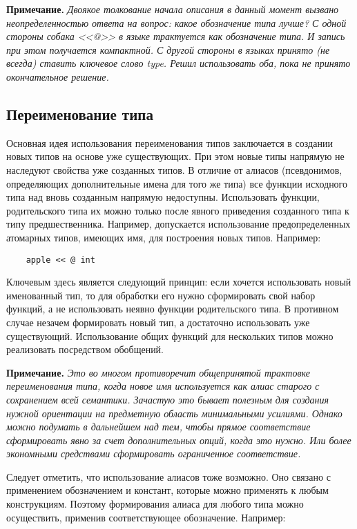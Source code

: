 {\textbf{Примечание.}
\textit{Двоякое толкование начала описания в данный момент вызвано неопределенностью ответа на вопрос: какое обозначение типа лучше? С одной стороны собака <<@>> в языке трактуется как обозначение типа. И запись при этом получается компактной. С другой стороны в языках принято (не всегда) ставить ключевое слово type. Решил использовать оба, пока не принято окончательное решение.}

\subsection{Переименование типа}

Основная идея использования переименования типов заключается в создании новых типов на основе уже существующих. При этом новые типы напрямую не наследуют свойства уже созданных типов. В отличие от алиасов (псевдонимов, определяющих дополнительные имена для того же типа) все функции исходного типа над вновь созданным напрямую недоступны. Использовать функции, родительского типа их можно только после явного приведения созданного типа к типу предшественника. Например, допускается использование предопределенных атомарных типов, имеющих имя, для построения новых типов. Например:

\begin{verbatim}
    apple << @ int
\end{verbatim}


Ключевым здесь является следующий принцип: если хочется использовать новый именованный тип, то для обработки его нужно сформировать свой набор функций, а не использовать неявно функции родительского типа. В противном случае незачем формировать новый тип, а достаточно использовать уже существующий. Использование общих функций для нескольких типов можно реализовать посредством обобщений.

\textbf{Примечание.}
\textit{Это во многом противоречит общепринятой трактовке переименования типа, когда новое имя используется как алиас старого с сохранением всей семантики. Зачастую это бывает полезным для создания нужной ориентации на предметную область минимальными усилиями. Однако можно подумать в дальнейшем над тем, чтобы прямое соответствие сформировать явно за счет дополнительных опций, когда это нужно. Или более экономными средствами сформировать ограниченное соответствие.}

Следует отметить, что использование алиасов тоже возможно. Оно связано с применением обозначением и констант, которые можно применять к любым конструкциям. Поэтому формирования алиаса для любого типа можно осуществить, применив соответствующее обозначение. Например:

}
